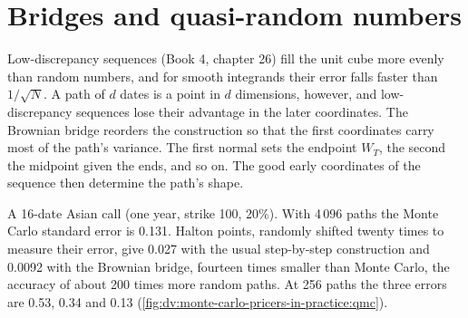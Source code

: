 \section{Bridges and quasi-random numbers}

Low-discrepancy sequences (Book 4, chapter 26) fill the unit cube more evenly than random numbers, and for smooth integrands their error falls faster
than $1/\sqrt N$. A path of $d$ dates is a point in $d$ dimensions, however, and low-discrepancy sequences lose their advantage in the later
coordinates. The Brownian bridge reorders the construction so that the first coordinates carry most of the path's variance. The first normal sets
the endpoint $W_T$, the second the midpoint given the ends, and so on. The good early coordinates of the sequence then determine the path's shape.

\begin{example}\label{ex:dv:monte-carlo-pricers-in-practice:qmc}
A 16-date Asian call (one year, strike 100, 20\%). With 4\,096 paths the Monte Carlo standard error is 0.131. Halton points, randomly shifted twenty times
to measure their error, give 0.027 with the usual step-by-step construction and 0.0092 with the Brownian bridge, fourteen times smaller than Monte Carlo,
the accuracy of about 200 times more random paths. At 256 paths the three errors are 0.53, 0.34 and 0.13
(\cref{fig:dv:monte-carlo-pricers-in-practice:qmc}).
\end{example}

\begin{omfigure}

\label{fig:dv:monte-carlo-pricers-in-practice:qmc}
\end{omfigure}

